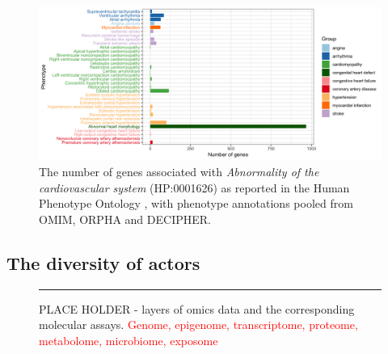 \documentclass[letter]{bioinfo}
\newcommand{\comment}[1]{\textcolor{red}{#1}}
\begin{document}




\begin{figure}[!tpb]
	\includegraphics[width=1.\linewidth]{hpo-gene-count}
	\caption{The number of genes associated with \textit{Abnormality of the cardiovascular system} (HP:0001626) as reported in the Human Phenotype Ontology \citep{Kohler:2014:Human}, with phenotype annotations pooled from OMIM, ORPHA and DECIPHER.}
	\label{fig:hpo_gene_count}	
\end{figure}


\subsection{The diversity of actors}


\begin{figure}[!tpb]
	\rule{2cm}{2cm}
	\caption{PLACE HOLDER - layers of omics data and the corresponding molecular assays. \comment{Genome, epigenome, transcriptome, proteome, metabolome, microbiome, exposome}}
	\label{fig:multiomics}
\end{figure} 
\end{document}
